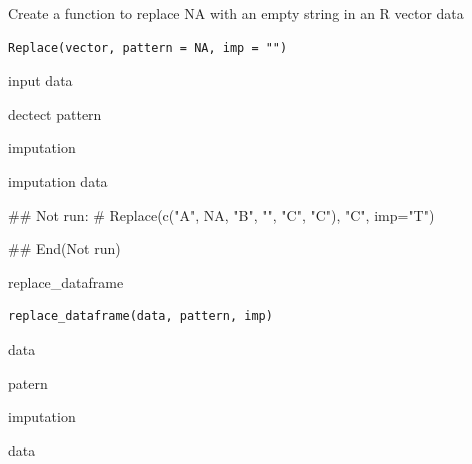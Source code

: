 \documentclass[a4paper]{book}
\begin{document}
%
\begin{Description}
Create a function to replace NA with an empty string in an R vector data
\end{Description}
%
\begin{Usage}
\begin{verbatim}
Replace(vector, pattern = NA, imp = "")
\end{verbatim}
\end{Usage}
%
\begin{Arguments}
\begin{ldescription}
\item[\code{vector}] input data

\item[\code{pattern}] dectect pattern

\item[\code{imp}] imputation
\end{ldescription}
\end{Arguments}
%
\begin{Value}
imputation data
\end{Value}
%
\begin{Examples}
\begin{ExampleCode}

\#\# Not run: 
# Replace(c("A", NA, "B", "", "C", "C"), "C", imp="T")

## End(Not run)

\end{ExampleCode}
\end{Examples}

%
\begin{Description}
replace\_dataframe
\end{Description}
%
\begin{Usage}
\begin{verbatim}
replace_dataframe(data, pattern, imp)
\end{verbatim}
\end{Usage}
%
\begin{Arguments}
\begin{ldescription}
\item[\code{data}] data

\item[\code{pattern}] patern

\item[\code{imp}] imputation
\end{ldescription}
\end{Arguments}
%
\begin{Value}
data
\end{Value}
\end{document}
